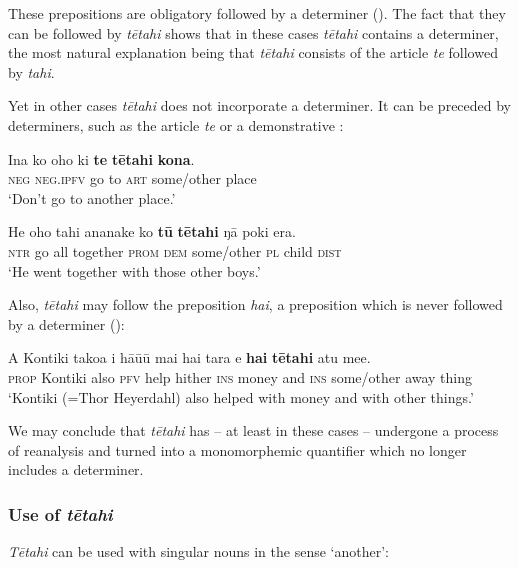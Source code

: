 These prepositions are obligatory followed by a determiner (). The fact that they can be followed by \textit{tētahi} shows that in these cases \textit{tētahi} contains a determiner, the most natural explanation being that \textit{tētahi} consists of the article \textit{te} followed by \textit{tahi}.

Yet in other cases \textit{tētahi} does not incorporate a determiner. It can be preceded by determiners, such as the article \textit{te}  or a demonstrative :

\ea\label{ex:4.80}
\gll {\ꞌ}Ina ko oho ki \textbf{te} \textbf{tētahi} \textbf{kona}. \\
\textsc{neg} \textsc{neg.ipfv} go to \textsc{art} some/other place \\

\glt 
‘Don’t go to another place.’ \textstyleExampleref{[R481.135]} 
\z

\ea\label{ex:4.81}
\gll He oho tahi ananake ko \textbf{tū} \textbf{tētahi} ŋā poki era. \\
\textsc{ntr} go all together \textsc{prom} \textsc{dem} some/other \textsc{pl} child \textsc{dist} \\

\glt
‘He went together with those other boys.’ \textstyleExampleref{[R161.027]} 
\z

Also, \textit{tētahi} may follow the preposition \textit{hai}, a preposition which is never followed by a determiner ():

\ea\label{ex:4.82}
\gll A Kontiki tako{\ꞌ}a i hā{\ꞌ}ū{\ꞌ}ū mai hai tara {\ꞌ}e \textbf{hai} \textbf{tētahi} atu me{\ꞌ}e. \\
\textsc{prop} Kontiki also \textsc{pfv} help hither \textsc{ins} money and \textsc{ins} some/other away thing \\

\glt
‘Kontiki (=Thor Heyerdahl) also helped with money and with other things.’ \textstyleExampleref{[R375.094]} 
\z

We may conclude that \textit{tētahi} has – at least in these cases – undergone a process of reanalysis and turned into a monomorphemic quantifier which no longer includes a determiner. 

\subsubsection[Use of tētahi]{Use of \textit{tētahi}}\label{sec:4.4.6.2}
\textit{Tētahi} can be used with singular nouns in the sense ‘another’:

